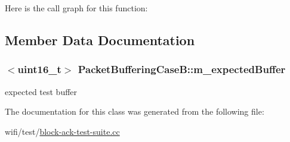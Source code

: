 Here is the call graph for this function\+:




\subsection{Member Data Documentation}
\subsubsection[{\texorpdfstring{m\+\_\+expected\+Buffer}{m_expectedBuffer}}]{$<$uint16\+\_\+t$>$ Packet\+Buffering\+Case\+B\+::m\+\_\+expected\+Buffer\hspace{0.3cm}{\ttfamily [private]}}\hypertarget{classPacketBufferingCaseB_a7ce5b33bdce1f08d8996fed97295f138}{}\label{classPacketBufferingCaseB_a7ce5b33bdce1f08d8996fed97295f138}


expected test buffer 



The documentation for this class was generated from the following file\+:\begin{DoxyCompactItemize}
\item 
wifi/test/\hyperlink{block-ack-test-suite_8cc}{block-\/ack-\/test-\/suite.\+cc}\end{DoxyCompactItemize}
